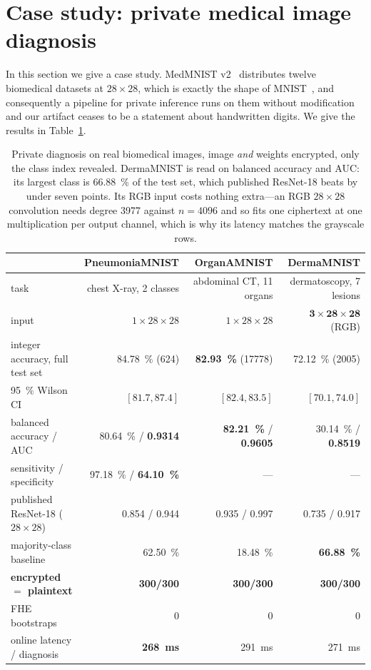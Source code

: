 \documentclass[11pt]{article}
\begin{document}
\section{Case study: private medical image diagnosis}
\label{sec:medmnist}

In this section we give a case study. MedMNIST v2~\cite{MedMNIST} distributes twelve
biomedical datasets at $28\times28$, which is exactly the shape of MNIST~\cite{MNIST}, and
consequently a pipeline for private inference runs on them without modification and our artifact
ceases to be a statement about handwritten digits. We give the results in
Table~\ref{tab:medmnist}.

\begin{table}[t]
\centering
\small
\begin{tabular}{@{}lrrr@{}}
\toprule
 & PneumoniaMNIST & OrganAMNIST & DermaMNIST \\
\midrule
task & chest X-ray, 2 classes & abdominal CT, 11 organs & dermatoscopy, 7 lesions \\
input & $1\times28\times28$ & $1\times28\times28$ & $\mathbf{3\times28\times28}$ (RGB) \\
integer accuracy, full test set & \SI{84.78}{\percent} (624) & \textbf{\SI{82.93}{\percent}} (\num{17778}) & \SI{72.12}{\percent} (\num{2005}) \\
\SI{95}{\percent} Wilson CI~\cite{Wilson} & $[81.7, 87.4]$ & $[82.4, 83.5]$ & $[70.1, 74.0]$ \\
balanced accuracy / AUC & \SI{80.64}{\percent} / \textbf{0.9314} & \textbf{\SI{82.21}{\percent}} / \textbf{0.9605} & \SI{30.14}{\percent} / \textbf{0.8519} \\
sensitivity / specificity & \SI{97.18}{\percent} / \textbf{\SI{64.10}{\percent}} & --- & --- \\
published ResNet-18 ($28\times28$) & 0.854 / 0.944 & 0.935 / 0.997 & 0.735 / 0.917 \\
majority-class baseline & \SI{62.50}{\percent} & \SI{18.48}{\percent} & \textbf{\SI{66.88}{\percent}} \\
\textbf{encrypted $=$ plaintext} & \textbf{300/300} & \textbf{300/300} & \textbf{300/300} \\
FHE bootstraps & 0 & 0 & 0 \\
online latency / diagnosis & \textbf{\SI{268}{\milli\second}} & \SI{291}{\milli\second} & \SI{271}{\milli\second} \\
\bottomrule
\end{tabular}
\caption{Private diagnosis on real biomedical images, image \emph{and} weights
encrypted, only the class index revealed. DermaMNIST is read on balanced accuracy and
AUC: its largest class is \SI{66.88}{\percent} of the test set, which published
ResNet-18 beats by under seven points. Its RGB input costs nothing extra---an RGB
$28\times28$ convolution needs degree \num{3977} against $n=4096$ and so fits one
ciphertext at one multiplication per output channel, which is why its latency matches
the grayscale rows.}
\label{tab:medmnist}
\end{table}
\end{document}

